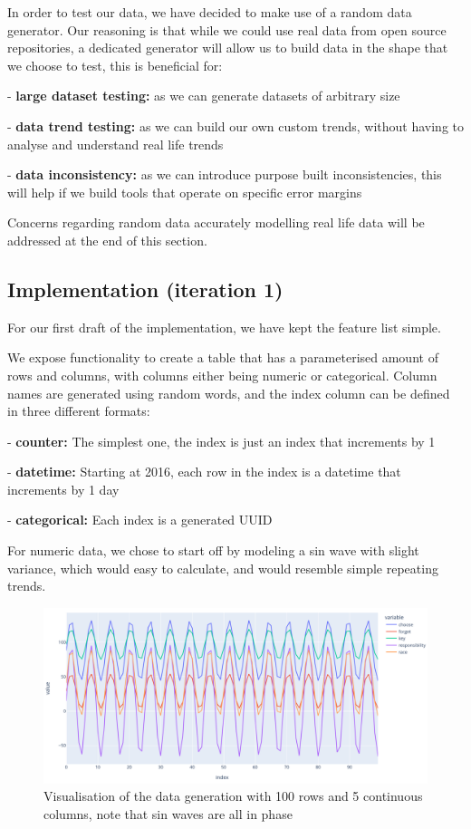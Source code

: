 In order to test our data, we have decided to make use of a random data generator.
Our reasoning is that while we could use real data from open source repositories, a dedicated generator will allow us
to build data in the shape that we choose to test, this is beneficial for:

- \textbf{large dataset testing:} as we can generate datasets of arbitrary size

- \textbf{data trend testing:} as we can build our own custom trends, without having to analyse and understand real life trends

- \textbf{data inconsistency:} as we can introduce purpose built inconsistencies, this will help if we build tools that operate on specific error margins

Concerns regarding random data accurately modelling real life data will be addressed at the end of this section.

\subsection{Implementation (iteration 1)}\label{subsec:implementation-(iteration-1)}
For our first draft of the implementation, we have kept the feature list simple.

We expose functionality to create a table that has a
parameterised amount of rows and columns, with columns either being numeric or categorical.
Column names are generated using random words, and the index column can be defined in three different formats:

- \textbf{counter:} The simplest one, the index is just an index that increments by 1

- \textbf{datetime:} Starting at 2016, each row in the index is a datetime that increments by 1 day

- \textbf{categorical:} Each index is a generated UUID

For numeric data, we chose to start off by modeling a sin wave with slight variance, which would easy to calculate, and
would resemble simple repeating trends.

\begin{figure}[H]
    \centering
    \includegraphics[width=12cm]{figures/data_generation/fake_data_gen_continuous_1}
    \caption{Visualisation of the data generation with 100 rows and 5 continuous columns, note that sin waves are all in phase}
    \label{fig:datagen_fig_1}
\end{figure}

